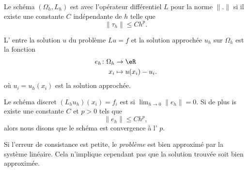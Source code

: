 \begin{definition}
	Le schéma \( (\Omega_h,L_h)\) est  avec l'opérateur différentiel \( L\) pour la norme \( \| . \|\) si il existe une constante \( C\) indépendante de \( h\) telle que
	\begin{equation}
		\| \tau_h \|\leq Ch^p.
	\end{equation}
\end{definition}

\begin{definition}
	L' entre la solution \( u\) du problème \( Lu=f\) et la solution approchée \( u_h\) sur \( \Omega_h\) est la fonction
	\begin{equation}
		\begin{aligned}
			e_h\colon \Omega_h & \to \eR             \\
			x_i                & \mapsto u(x_i)-u_i.
		\end{aligned}
	\end{equation}
	où \( u_i=u_h(x_i)\) est la solution approchée.

	Le schéma discret \( (L_hu_h)(x_i)=f_i\) est  si \( \lim_{h\to 0} \| e_h \|=0\). Si de plus is existe une constante \( C\) et \( p>0\) tels que
	\begin{equation}
		\| e_h \|\leq Ch^p,
	\end{equation}
	alors nous disons que le schéma est convergence à l' \( p\).
\end{definition}

Si l'erreur de consistance est petite, le \emph{problème} est bien approximé par la système linéaire. Cela n'implique cependant pas que la solution trouvée soit bien approximée.

